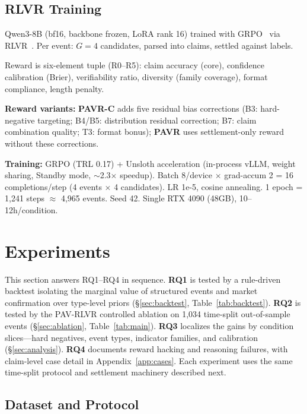 \documentclass[sigconf, anonymous, review]{acmart}
\begin{document}
\subsection{RLVR Training}
\label{sec:rlvr-training}

Qwen3-8B (bf16, backbone frozen, LoRA rank 16) trained with GRPO~\cite{grpo2025} via RLVR~\cite{rlvr2025}. Per event: $G=4$ candidates, parsed into claims, settled against labels.

Reward is six-element tuple (R0--R5): claim accuracy (core), confidence calibration (Brier), verifiability ratio, diversity (family coverage), format compliance, length penalty.

\textbf{Reward variants:} \textbf{PAVR-C} adds five residual bias corrections (B3: hard-negative targeting; B4/B5: distribution residual correction; B7: claim combination quality; T3: format bonus); \textbf{PAVR} uses settlement-only reward without these corrections.

\textbf{Training:} GRPO (TRL 0.17) + Unsloth acceleration (in-process vLLM, weight sharing, Standby mode, $\sim$2.3$\times$ speedup). Batch 8/device $\times$ grad-accum 2 = 16 completions/step (4 events $\times$ 4 candidates). LR 1e-5, cosine annealing. 1 epoch = 1,241 steps $\approx$ 4,965 events. Seed 42. Single RTX 4090 (48GB), 10--12h/condition.

\section{Experiments}
\label{sec:experiments}

This section answers RQ1--RQ4 in sequence. \textbf{RQ1} is tested by a rule-driven backtest isolating the marginal value of structured events and market confirmation over type-level priors (\S\ref{sec:backtest}, Table~\ref{tab:backtest}). \textbf{RQ2} is tested by the PAV-RLVR controlled ablation on 1,034 time-split out-of-sample events (\S\ref{sec:ablation}, Table~\ref{tab:main}). \textbf{RQ3} localizes the gains by condition slices---hard negatives, event types, indicator families, and calibration (\S\ref{sec:analysis}). \textbf{RQ4} documents reward hacking and reasoning failures, with claim-level case detail in Appendix~\ref{app:cases}. Each experiment uses the same time-split protocol and settlement machinery described next.

\subsection{Dataset and Protocol}
\end{document}
